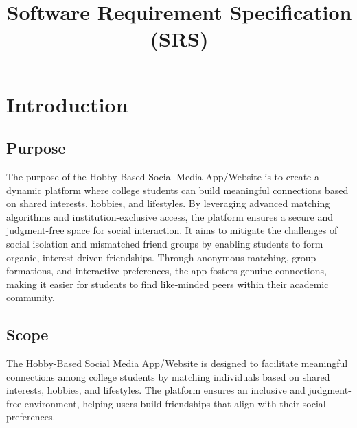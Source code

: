 \documentclass{article}
\title{Software Requirement Specification (SRS)}
\author{}
\date{}
\begin{document}
\maketitle
\newpage
\section{Introduction}
  \subsection{Purpose}
  The purpose of the Hobby-Based Social Media App/Website is to create a dynamic platform where college students can build meaningful connections based on shared interests, hobbies, and lifestyles. By leveraging advanced matching algorithms and institution-exclusive access, the platform ensures a secure and judgment-free space for social interaction. It aims to mitigate the challenges of social isolation and mismatched friend groups by enabling students to form organic, interest-driven friendships. Through anonymous matching, group formations, and interactive preferences, the app fosters genuine connections, making it easier for students to find like-minded peers within their academic community.
  \subsection{Scope}
  The Hobby-Based Social Media App/Website is designed to facilitate meaningful connections among college students by matching individuals based on shared interests, hobbies, and lifestyles. The platform ensures an inclusive and judgment-free environment, helping users build friendships that align with their social preferences.
\end{document}
